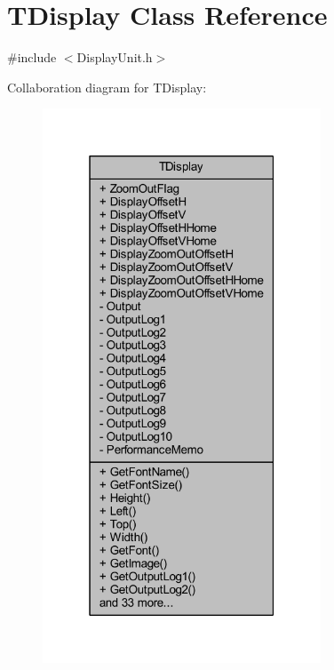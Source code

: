 \hypertarget{class_t_display}{}\section{T\+Display Class Reference}
\label{class_t_display}


{\ttfamily \#include $<$Display\+Unit.\+h$>$}



Collaboration diagram for T\+Display\+:\nopagebreak
\begin{figure}[H]
\begin{center}
\leavevmode
\includegraphics[width=235pt]{class_t_display__coll__graph}
\end{center}
\end{figure}
